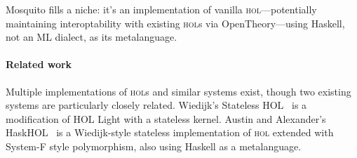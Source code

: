 \documentclass{llncs}
\begin{document}
Mosquito fills a niche: it's an implementation of vanilla \textsc{hol}---potentially maintaining interoptability with existing \textsc{hol}s via OpenTheory---using Haskell, not an ML dialect, as its metalanguage.

\paragraph{Related work}
Multiple implementations of \textsc{hol}s and similar systems exist, though two existing systems are particularly closely related.
Wiedijk's Stateless HOL~\cite{wiedijk:stateless:2011} is a modification of HOL Light with a stateless kernel.
Austin and Alexander's HaskHOL~\cite{austin:stateless:2013} is a Wiedijk-style stateless implementation of \textsc{hol} extended with System-F style polymorphism, also using Haskell as a metalanguage.
\end{document}
